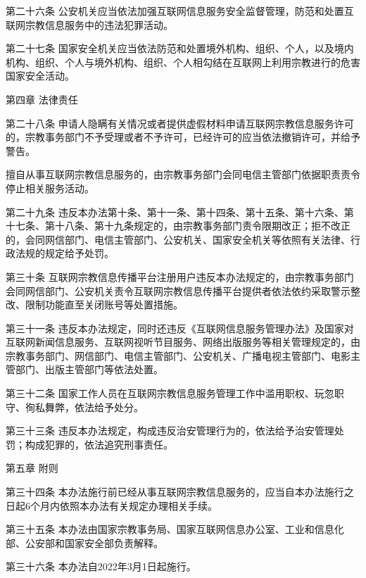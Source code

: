 \documentclass[UTF8, 11pt, oneside]{ctexart}
\newcommand{\juzhong}[1]{\begin{center}#1\end{center}}
\newcommand{\kongge}{\hspace{0.5em}}
\begin{document}
第二十六条 \kongge 公安机关应当依法加强互联网信息服务安全监督管理，防范和处置互联网宗教信息服务中的违法犯罪活动。

第二十七条 \kongge 国家安全机关应当依法防范和处置境外机构、组织、个人，以及境内机构、组织、个人与境外机构、组织、个人相勾结在互联网上利用宗教进行的危害国家安全活动。

\juzhong{第四章 \kongge 法律责任}

第二十八条 \kongge 申请人隐瞒有关情况或者提供虚假材料申请互联网宗教信息服务许可的，宗教事务部门不予受理或者不予许可，已经许可的应当依法撤销许可，并给予警告。

擅自从事互联网宗教信息服务的，由宗教事务部门会同电信主管部门依据职责责令停止相关服务活动。

第二十九条 \kongge 违反本办法第十条、第十一条、第十四条、第十五条、第十六条、第十七条、第十八条、第十九条规定的，由宗教事务部门责令限期改正；拒不改正的，会同网信部门、电信主管部门、公安机关、国家安全机关等依照有关法律、行政法规的规定给予处罚。

第三十条 \kongge 互联网宗教信息传播平台注册用户违反本办法规定的，由宗教事务部门会同网信部门、公安机关责令互联网宗教信息传播平台提供者依法依约采取警示整改、限制功能直至关闭账号等处置措施。

第三十一条 \kongge 违反本办法规定，同时还违反《互联网信息服务管理办法》及国家对互联网新闻信息服务、互联网视听节目服务、网络出版服务等相关管理规定的，由宗教事务部门、网信部门、电信主管部门、公安机关、广播电视主管部门、电影主管部门、出版主管部门等依法处置。

第三十二条 \kongge 国家工作人员在互联网宗教信息服务管理工作中滥用职权、玩忽职守、徇私舞弊，依法给予处分。

第三十三条 \kongge 违反本办法规定，构成违反治安管理行为的，依法给予治安管理处罚；构成犯罪的，依法追究刑事责任。

\newpage

\juzhong{第五章 \kongge 附则}

第三十四条 \kongge 本办法施行前已经从事互联网宗教信息服务的，应当自本办法施行之日起6个月内依照本办法有关规定办理相关手续。

第三十五条 \kongge 本办法由国家宗教事务局、国家互联网信息办公室、工业和信息化部、公安部和国家安全部负责解释。

第三十六条 \kongge 本办法自2022年3月1日起施行。
\end{document}
